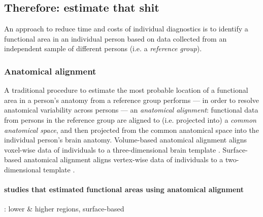 \subsection{Therefore: estimate that shit}

An approach to reduce time and costs of individual diagnostics is to identify a
functional area in an individual person based on data collected from an
independent sample of different persons (i.e. a \textit{reference group}).



\subsubsection{Anatomical alignment}

%
A traditional procedure \citep{frost2012measuring, weiner2018defining,
zhen2017quantifying, zhen2015quantifying, rosenke2021probabilistic,
wang2015probabilistic} to estimate the most probable location of a functional
area in a person's anatomy from a reference group performs --- in order to
resolve anatomical variability across persons --- an \textit{anatomical
alignment}:
%
functional data from persons in the reference group are aligned to (i.e.
projected into) a \textit{common anatomical space}, and then projected from the
common anatomical space into the individual person's brain anatomy.
Volume-based anatomical alignment \citep[s.][for a review]{klein2009evaluation}
aligns voxel-wise data of individuals to a three-dimensional brain template
\citep[e.g., MNI152 template;][]{fonov2011unbiased}.
Surface-based anatomical alignment \citep{fischl1999cortical} aligns vertex-wise
data of individuals to a two-dimensional template \citep[e.g., FreeSurfer
fsaverage template;][]{fischl1999high}.


\paragraph{studies that estimated functional areas using anatomical alignment}



\citet{rosenke2021probabilistic}: lower \& higher regions, surface-based

